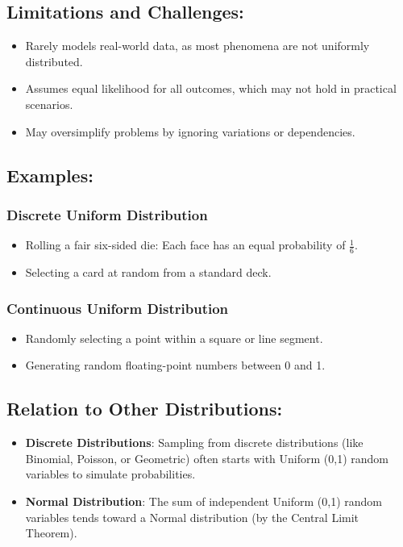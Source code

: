 \subsection*{Limitations and Challenges:}
\begin{itemize}
    \item Rarely models real-world data, as most phenomena are not uniformly distributed.
    \item Assumes equal likelihood for all outcomes, which may not hold in practical scenarios.
    \item May oversimplify problems by ignoring variations or dependencies.
\end{itemize}

\subsection*{Examples:}
\subsubsection*{Discrete Uniform Distribution}
\begin{itemize}
    \item Rolling a fair six-sided die: Each face has an equal probability of $\frac{1}{6}$.
    \item Selecting a card at random from a standard deck.
\end{itemize}
\subsubsection*{Continuous Uniform Distribution}
\begin{itemize}
    \item Randomly selecting a point within a square or line segment.
    \item Generating random floating-point numbers between 0 and 1.
\end{itemize}

\subsection*{Relation to Other Distributions:}
\begin{itemize}
    \item \textbf{Discrete Distributions}: Sampling from discrete distributions (like Binomial, Poisson, or Geometric) often starts with Uniform (0,1) random variables to simulate probabilities.
    \item \textbf{Normal Distribution}: The sum of independent Uniform (0,1) random variables tends toward a Normal distribution (by the Central Limit Theorem).
\end{itemize}

